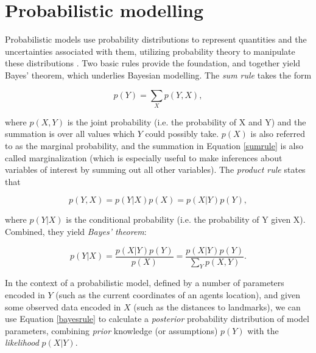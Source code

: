

\section{Probabilistic modelling}

Probabilistic models use probability distributions to represent quantities and the uncertainties associated with them, utilizing probability theory to manipulate these distributions \citep{ghahramani2015probabilistic}. Two basic rules provide the foundation, and together yield Bayes' theorem, which underlies Bayesian modelling. The \textit{sum rule} takes the form

\begin{equation}
\label{sumrule}
p(Y) = \sum_{X} p(Y, X),
\end{equation}

where $p(X,Y)$ is the joint probability (i.e. the probability of X and Y) and the summation is over all values which $Y$ could possibly take. $p(X)$ is also referred to as the marginal probability, and the summation in Equation \ref{sumrule} is also called marginalization (which is especially useful to make inferences about variables of interest by summing out all other variables). The \textit{product rule} states that

\begin{equation}
\label{productrule}
p(Y,X) = p(Y|X)p(X) = p(X|Y)p(Y),
\end{equation}

where $p(Y|X)$ is the conditional probability (i.e. the probability of Y given X). Combined, they yield \textit{Bayes' theorem}:

\begin{equation}
\label{bayesrule}
p(Y|X) = \frac{p(X|Y)p(Y)}{p(X)} = \frac{p(X|Y)p(Y)}{\sum_{Y} p(X, Y)}.
\end{equation}

In the context of a probabilistic model, defined by a number of parameters encoded in $Y$ (such as the current coordinates of an agents location), and given some observed data encoded in $X$ (such as the distances to landmarks), we can use Equation \ref{bayesrule} to calculate a \textit{posterior} probability distribution of model parameters, combining \textit{prior} knowledge (or assumptions) $p(Y)$ with the \textit{likelihood} $p(X|Y)$.


